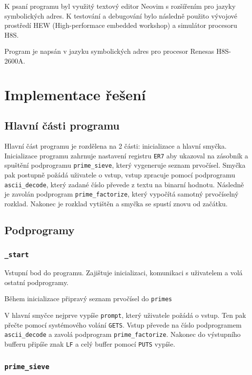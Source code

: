 \documentclass[12pt]{article}
\newcommand{\code}[1]{\mbox{\texttt{#1}}}
\begin{document}
K psaní programu byl využitý textový editor Neovim s rozšířením pro jazyky
symbolických adres. K testování a debugování bylo následně použito vývojové
prostředí HEW (High-performace embedded workshop) a simulátor procesoru H8S.

Program je napsán v jazyku symbolických adres pro procesor Renesas H8S-2600A.

\section{Implementace řešení}

\subsection{Hlavní části programu}

Hlavní část programu je rozdělena na 2 části: inicializace a hlavní smyčka.
Inicializace programu zahrnuje nastavení registru \code{ER7} aby ukazoval na
zásobník a spuštění podprogramu \code{prime\_sieve}, který vygeneruje seznam
prvočísel. Smyčka pak postupně požádá uživatele o vstup, vstup zpracuje pomocí
podprogramu \code{ascii\_decode}, který zadané číslo převede z textu na binarní
hodnotu. Následně je zavolán podprogram \code{prime\_factorize}, který vypočítá
samotný prvočíselný rozklad. Nakonec je rozklad vytištěn a smyčka se spustí
znovu od začátku.

\subsection{Podprogramy}

\subsubsection{\code{\_start}}

Vstupní bod do programu. Zajištuje inicializaci, komunikaci s uživatelem a volá
ostatní podprogramy.

Během inicializace připravý seznam prvočísel do \code{primes}

V hlavní smyčce nejprve vypíše \code{prompt}, který uživatele požádá o vstup.
Ten pak přečte pomocí systémového volání \code{GETS}. Vstup převede na číslo
podprogramem \code{ascii\_decode} a zavolá podprogram \code{prime\_factorize}.
Nakonec do výstupního bufferu připíše znak \code{LF} a celý buffer pomocí
\code{PUTS} vypíše.

\subsubsection{\code{prime\_sieve}}
\end{document}
